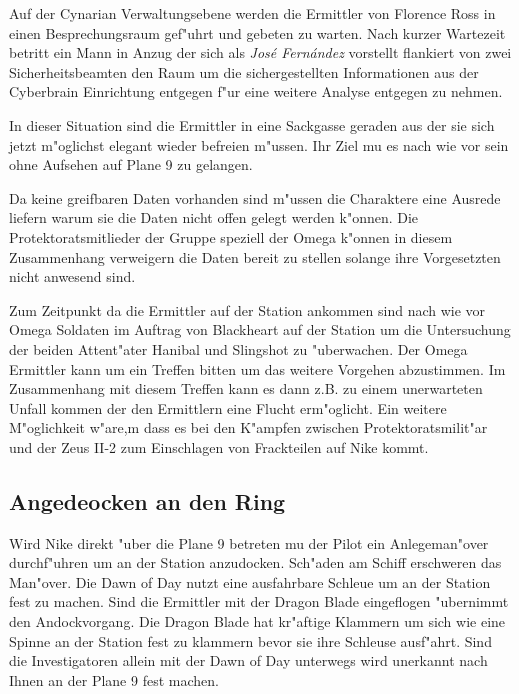 Auf der Cynarian Verwaltungsebene werden die Ermittler von Florence Ross in einen Besprechungsraum gef"uhrt und gebeten zu warten. Nach kurzer Wartezeit betritt ein Mann in Anzug der sich als \emph{Jos\'e Fern\'andez} vorstellt flankiert von zwei Sicherheitsbeamten den Raum
um die sichergestellten Informationen aus der Cyberbrain Einrichtung entgegen f"ur eine weitere Analyse entgegen zu nehmen. 

\begin{remarks}
	In dieser Situation sind die Ermittler in eine Sackgasse geraden aus der sie sich jetzt m"oglichst elegant wieder befreien m"ussen. Ihr Ziel mu\3 es nach wie vor sein ohne Aufsehen auf Plane 9 zu gelangen. 

	Da keine greifbaren Daten vorhanden sind m"ussen die Charaktere eine Ausrede liefern warum sie die Daten nicht offen gelegt werden k"onnen. Die Protektoratsmitlieder der Gruppe speziell der Omega k"onnen in diesem Zusammenhang verweigern die Daten bereit zu stellen solange ihre Vorgesetzten nicht anwesend sind.

	Zum Zeitpunkt da die Ermittler auf der Station ankommen sind nach wie vor Omega Soldaten im Auftrag von Blackheart auf der Station um die Untersuchung der beiden Attent"ater Hanibal und Slingshot zu "uberwachen. Der Omega Ermittler kann um ein Treffen bitten um das weitere Vorgehen abzustimmen. Im Zusammenhang mit diesem Treffen kann es dann z.B. zu einem unerwarteten Unfall kommen der den Ermittlern eine Flucht erm"oglicht. Ein weitere M"oglichkeit w"are,m dass es bei den K"ampfen zwischen Protektoratsmilit"ar und der Zeus II-2 zum Einschlagen von Frackteilen auf Nike kommt.
\end{remarks}

\subsection{Angedeocken an den Ring}
Wird Nike direkt "uber die Plane 9 betreten mu\3 der Pilot ein Anlegeman"over durchf"uhren um an der Station anzudocken. Sch"aden am Schiff erschweren das Man"over. Die Dawn of Day nutzt eine ausfahrbare Schleu\3e um an der Station fest zu machen. Sind die Ermittler mit der Dragon Blade eingeflogen "ubernimmt \xl{} den Andockvorgang. Die Dragon Blade hat kr"aftige Klammern um sich wie eine Spinne an der Station fest zu klammern bevor sie ihre Schleuse ausf"ahrt. Sind die Investigatoren allein mit der Dawn of Day unterwegs wird \xl{} unerkannt nach Ihnen an der Plane 9 fest machen.

